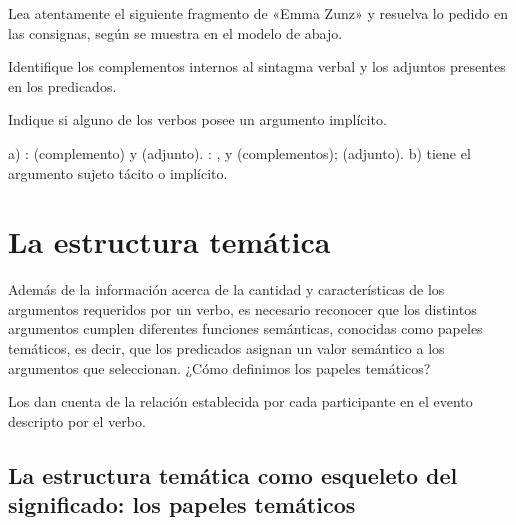 \begin{ejercicio}\label{ej:07-compadj}
Lea atentamente el siguiente fragmento de «Emma Zunz» y resuelva lo pedido en
las consignas, según se muestra en el modelo de abajo.


\begin{consignas}
  \item Identifique los complementos internos al sintagma verbal y los adjuntos
        presentes en los predicados.
  \item Indique si alguno de los verbos posee un argumento implícito.
\end{consignas}

\begin{resuelto}
a) :  (complemento) y 
(adjunto). : ,  y  (complementos);  (adjunto). b) 
tiene el argumento sujeto tácito o implícito.
\end{resuelto}
\end{ejercicio}

\section{La estructura temática}\label{sec:07-tematica}

Además de la información acerca de la cantidad y características de los
argumentos requeridos por un verbo, es necesario reconocer que los distintos
argumentos cumplen diferentes funciones semánticas, conocidas como papeles
temáticos, es decir, que los predicados asignan un valor semántico a los
argumentos que seleccionan. ¿Cómo definimos los papeles temáticos?

\begin{destacado}
Los  dan cuenta de la relación establecida por cada
participante en el evento descripto por el verbo.
\end{destacado}

\subsection{La estructura temática como esqueleto del significado: los papeles temáticos}\label{sec:07-papeles}

